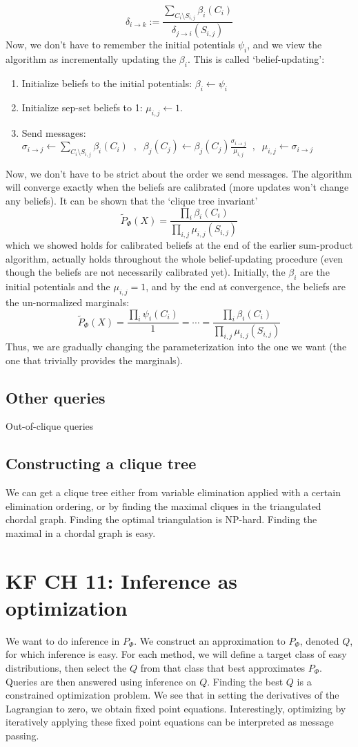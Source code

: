 \documentclass[11pt]{article}
\begin{document}
\[ \delta_{i \to k} := \frac{\sum_{C_i \setminus S_{i,j}} \beta_i(C_i) }{\delta_{j \to i}(S_{i,j})} \]
Now, we don't have to remember the initial potentials $\psi_i$, and we view the algorithm as incrementally updating the $\beta_i$. This is called `belief-updating':
\begin{enumerate}
\item Initialize beliefs to the initial potentials: $ \beta_i \gets \psi_i$
\item Initialize sep-set beliefs to 1: $\mu_{i,j} \gets 1$.
\item Send messages: $ \sigma_{i \to j} \gets \sum_{C_i \setminus S_{i,j}} \beta_i(C_i) \;\;,\;\; \beta_j(C_j) \gets \beta_j(C_j) \frac{\sigma_{i \to j}}{\mu_{i,j}} \;\;,\;\; \mu_{i,j} \gets \sigma_{i \to j} $
\end{enumerate}
Now, we don't have to be strict about the order we send messages. The algorithm will converge exactly when the beliefs are calibrated (more updates won't change any beliefs). It can be shown that the `clique tree invariant'
\[ \tilde{P}_\Phi(X) = \frac{\prod_i \beta_i(C_i) }{\prod_{i,j} \mu_{i,j}(S_{i,j})} \]
which we showed holds for calibrated beliefs at the end of the earlier sum-product algorithm, actually holds throughout the whole belief-updating procedure (even though the beliefs are not necessarily calibrated yet). Initially, the $\beta_i$ are the initial potentials and the $\mu_{i,j} = 1$, and by the end at convergence, the beliefs are the un-normalized marginals:
\[ \tilde{P}_\Phi(X) = \frac{\prod_i \psi_i(C_i)}{1} = \cdots = \frac{\prod_i \beta_i(C_i)}{\prod_{i,j} \mu_{i,j}(S_{i,j})} \]
Thus, we are gradually changing the parameterization into the one we want (the one that trivially provides the marginals).
\subsection*{Other queries}
Out-of-clique queries

\subsection*{Constructing a clique tree}
We can get a clique tree either from variable elimination applied with a certain elimination ordering, or by finding the maximal cliques in the triangulated chordal graph. Finding the optimal triangulation is NP-hard. Finding the maximal in a chordal graph is easy.

\section*{ KF CH 11: Inference as optimization}
We want to do inference in $P_\Phi$. We construct an approximation to $P_\Phi$, denoted $Q$, for which inference is easy. For each method, we will define a target class of easy distributions, then select the $Q$ from that class that best approximates $P_\Phi$. Queries are then answered using inference on $Q$. Finding the best $Q$ is a constrained optimization problem. We see that in setting the derivatives of the Lagrangian to zero, we obtain fixed point equations. Interestingly, optimizing by iteratively applying these fixed point equations can be interpreted as message passing.
\end{document}
